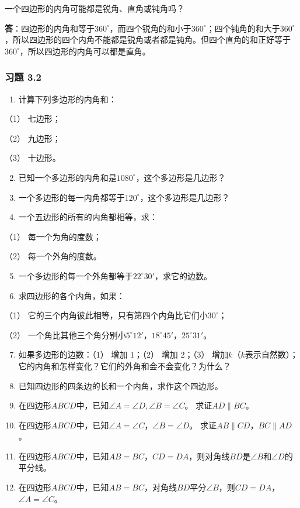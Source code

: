 一个四边形的内角可能都是锐角、直角或钝角吗？

\textbf{答}：四边形的内角和等于\(360^{\circ}\)，而四个锐角的和小于\(360^{\circ}\)；四个钝角的和大于\(360^{\circ}\)，所以四边形的四个内角不能都是锐角或者都是钝角。但四个直角的和正好等于\(360^{\circ}\)，所以四边形的内角可以都是直角。

\subsubsection{习题 3.2}

\begin{enumerate}
\item
  计算下列多边形的内角和：
\end{enumerate}

（1） 七边形；

（2） 九边形；

（3） 十边形。

\begin{enumerate}
\setcounter{enumi}{1}
\item
  已知一个多边形的内角和是\(1080^{\circ}\)，这个多边形是几边形？
\item
  一个多边形的每一内角都等于\(120^{\circ}\)，这个多边形是几边形？
\item
  一个五边形的所有的内角都相等，求：
\end{enumerate}

（1） 每一个为角的度数；

（2） 每一个外角的度数。

\begin{enumerate}
\setcounter{enumi}{4}
\item
  一个多边形的每一个外角都等于\(22^{\circ}30'\)，求它的边数。
\item
  求四边形的各个内角，如果：
\end{enumerate}

（1） 它的三个内角彼此相等，只有第四个内角比它们小\(30^{\circ}\)；

（2）
一个角比其他三个角分别小\(5^{\circ}12'\)，\(18^{\circ}45'\)，\(25^{\circ}31'\)。

\begin{enumerate}
\setcounter{enumi}{6}
\item
  如果多边形的边数：（1） 增加 1；（2） 增加 2；（3）
  增加\(k\)（\(k\)表示自然数）；它的内角和怎样变化？它们的外角和会不会变化？为什么？
\item
  已知四边形的四条边的长和一个内角，求作这个四边形。
\item
  在四边形\(ABCD\)中，已知\(\angle A = \angle D, \angle B = \angle C\)。
  求证\(AD \parallel BC\)。
\item
  在四边形\(ABCD\)中，已知\(\angle A = \angle C\)，\(\angle B = \angle D\)。
  求证\(AB \parallel CD\)，\(BC \parallel AD\)。
\item
  在四边形\(ABCD\)中，已知\(AB=BC\)，\(CD=DA\)，则对角线\(BD\)是\(\angle B\)和\(\angle D\)的平分线。
\item
  在四边形\(ABCD\)中，已知\(AB=BC\)，对角线\(BD\)平分\(\angle B\)，则\(CD=DA\)，\(\angle A=\angle C\)。
\end{enumerate}

